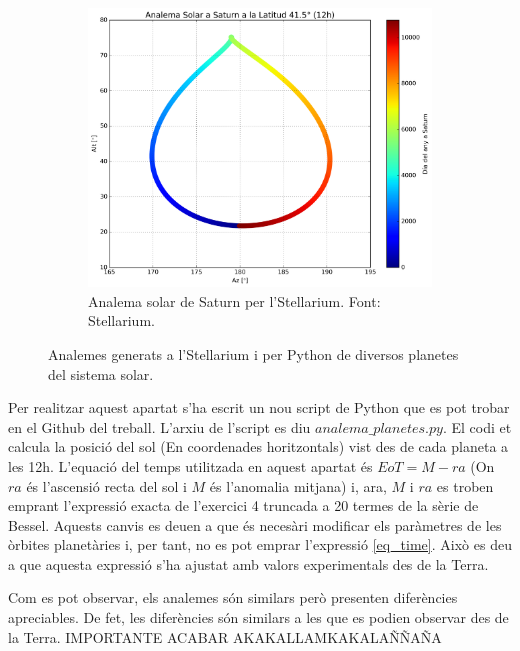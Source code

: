 \documentclass[a4paper, 11pt]{article}
\begin{document}
\begin{figure}[h!]
\begin{subfigure}{0.45\textwidth}
        \includegraphics[width=\textwidth]{images/analema_Saturn.png}
        \caption{Analema solar de Saturn per l'Stellarium. Font: Stellarium.}
    \end{subfigure}
\caption{Analemes generats a l'Stellarium i per Python de diversos planetes del sistema solar.}
\label{fig:planetes}
\end{figure}
\vspace{2mm}

\noindent Per realitzar aquest apartat s'ha escrit un nou script de Python que es pot trobar en el Github del treball. L'arxiu de l'script es diu $analema\_planetes.py$. El codi et calcula la posició del sol (En coordenades horitzontals) vist des de cada planeta a les 12h. L'equació del temps utilitzada en aquest apartat és $EoT = M - ra$ (On $ra$ és l'ascensió recta del sol i $M$ és l'anomalia mitjana) i, ara, $M$ i $ra$ es troben emprant l'expressió exacta de l'exercici 4 truncada a 20 termes de la sèrie de Bessel. Aquests canvis es deuen a que és necesàri modificar els paràmetres de les òrbites planetàries i, per tant, no es pot emprar l'expressió \ref{eq_time}. Això es deu a que aquesta expressió s'ha ajustat amb valors experimentals des de la Terra.

\vspace{2mm}

\noindent Com es pot observar, els analemes són similars però presenten diferències apreciables. De fet, les diferències són similars a les que es podien observar des de la Terra. IMPORTANTE ACABAR AKAKALLAMKAKALAÑÑAÑA
\end{document}
